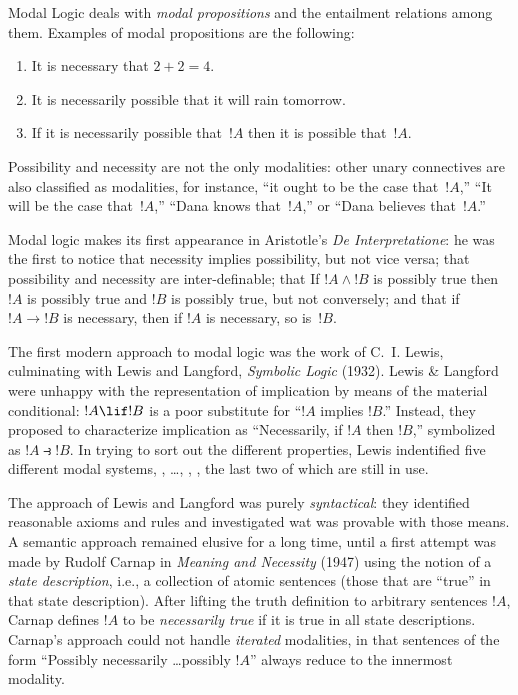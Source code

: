 \documentclass[../../../include/open-logic-section]{subfiles}
\begin{document}


Modal Logic deals with \emph{modal propositions} and the entailment
relations among them. Examples of modal propositions are the
following:
\begin{enumerate}
\item It is necessary that $2+2=4$.
\item It is necessarily possible that it will rain tomorrow.
\item If it is necessarily possible that~$!A$ then it is possible
  that~$!A$.
\end{enumerate}
Possibility and necessity are not the only modalities: other unary
connectives are also classified as modalities, for instance, ``it
ought to be the case that~$!A$,'' ``It will be the case that~$!A$,''
``Dana knows that~$!A$,'' or ``Dana believes that~$!A$.''

Modal logic makes its first appearance in Aristotle's \emph{De
  Interpretatione}: he was the first to notice that necessity implies
possibility, but not vice versa; that possibility and necessity are
inter-definable; that If $!A \land !B$ is possibly true then
$!A$ is possibly true and $!B$ is possibly true, but not
conversely; and that if $!A \to !B$ is necessary, then if
$!A$ is necessary, so is~$!B$.

The first modern approach to modal logic was the work of C.~I. Lewis,
culminating with Lewis and Langford, \emph{Symbolic Logic}
(1932). Lewis \& Langford were unhappy with the representation of
implication by means of the material conditional: $!A \lif !B$
is a poor substitute for ``$!A$ implies $!B$.'' Instead, they
proposed to characterize implication as ``Necessarily, if $!A$
then $!B$,'' symbolized as $!A \strictif !B$. In trying to
sort out the different properties, Lewis indentified five different
modal systems, , \ldots, , , the last
two of which are still in use.

The approach of Lewis and Langford was purely \emph{syntactical}: they
identified reasonable axioms and rules and investigated wat was
provable with those means. A semantic approach remained elusive for a
long time, until a first attempt was made by Rudolf Carnap in
\emph{Meaning and Necessity} (1947) using the notion of a \emph{state
  description}, i.e., a collection of atomic sentences (those that are
``true'' in that state description). After lifting the truth
definition to arbitrary sentences $!A$, Carnap defines $!A$
to be \emph{necessarily true} if it is true in all state
descriptions. Carnap's approach could not handle \emph{iterated}
modalities, in that sentences of the form ``Possibly necessarily
\ldots possibly $!A$'' always reduce to the innermost modality.
\end{document}
